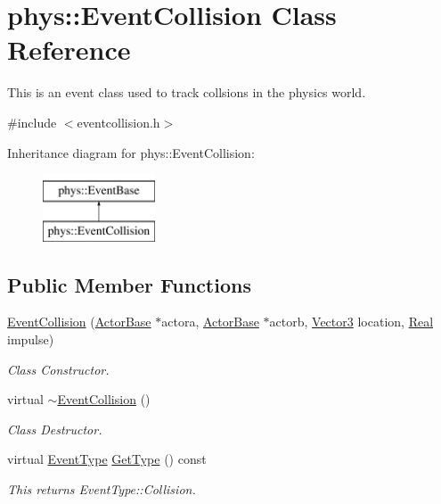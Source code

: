 \hypertarget{classphys_1_1EventCollision}{
\section{phys::EventCollision Class Reference}
\label{dd/de9/classphys_1_1EventCollision}
}


This is an event class used to track collsions in the physics world.  




{\ttfamily \#include $<$eventcollision.h$>$}

Inheritance diagram for phys::EventCollision:\begin{figure}[H]
\begin{center}
\leavevmode
\includegraphics[height=2.000000cm]{dd/de9/classphys_1_1EventCollision}
\end{center}
\end{figure}
\subsection*{Public Member Functions}
\begin{DoxyCompactItemize}
\item 
\hyperlink{classphys_1_1EventCollision_ac191dc44f83f6ddd2bff4f233b354372}{EventCollision} (\hyperlink{classphys_1_1ActorBase}{ActorBase} $\ast$actora, \hyperlink{classphys_1_1ActorBase}{ActorBase} $\ast$actorb, \hyperlink{classphys_1_1Vector3}{Vector3} location, \hyperlink{namespacephys_af7eb897198d265b8e868f45240230d5f}{Real} impulse)
\begin{DoxyCompactList}\small\item\em Class Constructor. \item\end{DoxyCompactList}\item 
virtual \hyperlink{classphys_1_1EventCollision_afcbf057fc955ce6c05b21c08325b1822}{$\sim$EventCollision} ()
\begin{DoxyCompactList}\small\item\em Class Destructor. \item\end{DoxyCompactList}\item 
virtual \hyperlink{classphys_1_1EventBase_a5e6a8564e127f654123f0bf6a2751923}{EventType} \hyperlink{classphys_1_1EventCollision_a96c2809f1bbab78b9f2758cea15a9a36}{GetType} () const 
\begin{DoxyCompactList}\small\item\em This returns EventType::Collision. \item\end{DoxyCompactList}\end{DoxyCompactItemize}
